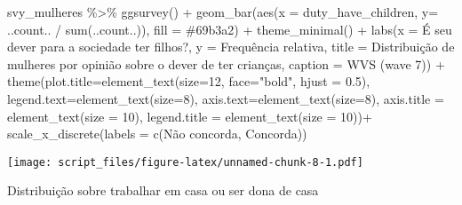 \documentclass[
]{article}
\newenvironment{Shaded}{\begin{snugshade}}{\end{snugshade}}
\newcommand{\AttributeTok}[1]{\textcolor[rgb]{0.77,0.63,0.00}{#1}}
\newcommand{\DecValTok}[1]{\textcolor[rgb]{0.00,0.00,0.81}{#1}}
\newcommand{\FloatTok}[1]{\textcolor[rgb]{0.00,0.00,0.81}{#1}}
\newcommand{\FunctionTok}[1]{\textcolor[rgb]{0.00,0.00,0.00}{#1}}
\newcommand{\NormalTok}[1]{#1}
\newcommand{\SpecialCharTok}[1]{\textcolor[rgb]{0.00,0.00,0.00}{#1}}
\newcommand{\StringTok}[1]{\textcolor[rgb]{0.31,0.60,0.02}{#1}}
\begin{document}
\begin{Shaded}
\begin{Highlighting}[]
\NormalTok{svy\_mulheres }\SpecialCharTok{\%\textgreater{}\%}
  \FunctionTok{ggsurvey}\NormalTok{() }\SpecialCharTok{+}
  \FunctionTok{geom\_bar}\NormalTok{(}\FunctionTok{aes}\NormalTok{(}\AttributeTok{x =}\NormalTok{ duty\_have\_children, }\AttributeTok{y=}\NormalTok{ ..count.. }\SpecialCharTok{/} \FunctionTok{sum}\NormalTok{(..count..)), }\AttributeTok{fill =} \StringTok{\textquotesingle{}\#69b3a2\textquotesingle{}}\NormalTok{) }\SpecialCharTok{+}
  \FunctionTok{theme\_minimal}\NormalTok{() }\SpecialCharTok{+}
  \FunctionTok{labs}\NormalTok{(}\AttributeTok{x =} \StringTok{\textquotesingle{}É seu dever para a sociedade ter filhos?\textquotesingle{}}\NormalTok{,}
       \AttributeTok{y =} \StringTok{\textquotesingle{}Frequência relativa\textquotesingle{}}\NormalTok{,}
       \AttributeTok{title =} \StringTok{\textquotesingle{}Distribuição de mulheres por opinião sobre o dever de ter crianças\textquotesingle{}}\NormalTok{,}
       \AttributeTok{caption =} \StringTok{\textquotesingle{}WVS (wave 7)\textquotesingle{}}\NormalTok{) }\SpecialCharTok{+}
  \FunctionTok{theme}\NormalTok{(}\AttributeTok{plot.title=}\FunctionTok{element\_text}\NormalTok{(}\AttributeTok{size=}\DecValTok{12}\NormalTok{, }\AttributeTok{face=}\StringTok{"bold"}\NormalTok{, }\AttributeTok{hjust =} \FloatTok{0.5}\NormalTok{),}
        \AttributeTok{legend.text=}\FunctionTok{element\_text}\NormalTok{(}\AttributeTok{size=}\DecValTok{8}\NormalTok{),}
        \AttributeTok{axis.text=}\FunctionTok{element\_text}\NormalTok{(}\AttributeTok{size=}\DecValTok{8}\NormalTok{),}
        \AttributeTok{axis.title =} \FunctionTok{element\_text}\NormalTok{(}\AttributeTok{size =} \DecValTok{10}\NormalTok{),}
        \AttributeTok{legend.title =} \FunctionTok{element\_text}\NormalTok{(}\AttributeTok{size =} \DecValTok{10}\NormalTok{))}\SpecialCharTok{+}
  \FunctionTok{scale\_x\_discrete}\NormalTok{(}\AttributeTok{labels =} \FunctionTok{c}\NormalTok{(}\StringTok{\textquotesingle{}Não concorda\textquotesingle{}}\NormalTok{, }\StringTok{\textquotesingle{}Concorda\textquotesingle{}}\NormalTok{))}
\end{Highlighting}
\end{Shaded}

\texttt{[image: script\_files/figure-latex/unnamed-chunk-8-1.pdf]}

Distribuição sobre trabalhar em casa ou ser dona de casa
\end{document}
